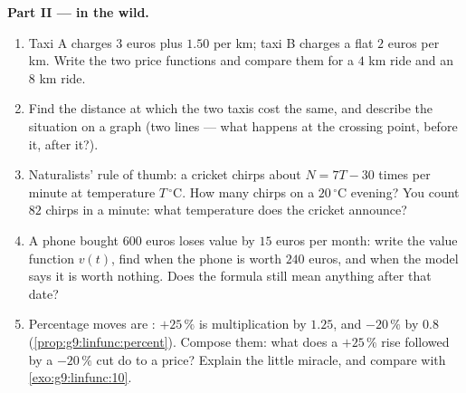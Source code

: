 \begin{problem}
\medskip
\noindent\textbf{Part II ---  in the wild.}
\begin{enumerate}[resume]
  \item Taxi A charges $3$ euros plus $1.50$ per km; taxi B
        charges a flat $2$ euros per km. Write the two price
        functions and compare them for a $4$ km ride and an
        $8$ km ride.
  \item Find the  distance at which the two taxis cost
        the same, and describe the situation on a graph (two
        lines --- what happens at the crossing point, before it,
        after it?).
  \item Naturalists' rule of thumb: a cricket chirps about
        $N = 7T - 30$ times per minute at temperature
        $T\,^\circ$C. How many chirps on a $20\,^\circ$C
        evening? You count $82$ chirps in a minute: what
        temperature does the cricket announce?
  \item A phone bought $600$ euros loses value by $15$ euros per
        month: write the value function $v(t)$, find when the
        phone is worth $240$ euros, and when the model says it
        is worth nothing. Does the formula still mean anything
        after that date?
  \item Percentage moves are : $+25\,\%$ is
        multiplication by $1.25$, and $-20\,\%$ by $0.8$
        (\cref{prop:g9:linfunc:percent}). Compose them: what
        does a $+25\,\%$ rise followed by a $-20\,\%$ cut do to
        a price? Explain the little miracle, and compare with
        \cref{exo:g9:linfunc:10}.
\end{enumerate}


\end{problem}
